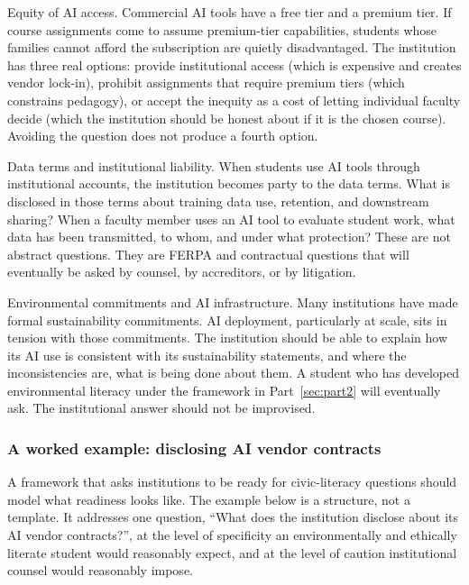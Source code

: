 \documentclass[12pt]{article}
\begin{document}
Equity of AI access. Commercial AI tools have a free tier and a premium tier. If course assignments come to assume premium-tier capabilities, students whose families cannot afford the subscription are quietly disadvantaged. The institution has three real options: provide institutional access (which is expensive and creates vendor lock-in), prohibit assignments that require premium tiers (which constrains pedagogy), or accept the inequity as a cost of letting individual faculty decide (which the institution should be honest about if it is the chosen course). Avoiding the question does not produce a fourth option.

Data terms and institutional liability. When students use AI tools through institutional accounts, the institution becomes party to the data terms. What is disclosed in those terms about training data use, retention, and downstream sharing? When a faculty member uses an AI tool to evaluate student work, what data has been transmitted, to whom, and under what protection? These are not abstract questions. They are FERPA and contractual questions that will eventually be asked by counsel, by accreditors, or by litigation.

Environmental commitments and AI infrastructure. Many institutions have made formal sustainability commitments. AI deployment, particularly at scale, sits in tension with those commitments. The institution should be able to explain how its AI use is consistent with its sustainability statements, and where the inconsistencies are, what is being done about them. A student who has developed environmental literacy under the framework in Part~\ref{sec:part2} will eventually ask. The institutional answer should not be improvised.

\subsubsection*{A worked example: disclosing AI vendor contracts}

A framework that asks institutions to be ready for civic-literacy questions should model what readiness looks like. The example below is a structure, not a template. It addresses one question, ``What does the institution disclose about its AI vendor contracts?'', at the level of specificity an environmentally and ethically literate student would reasonably expect, and at the level of caution institutional counsel would reasonably impose.
\end{document}
